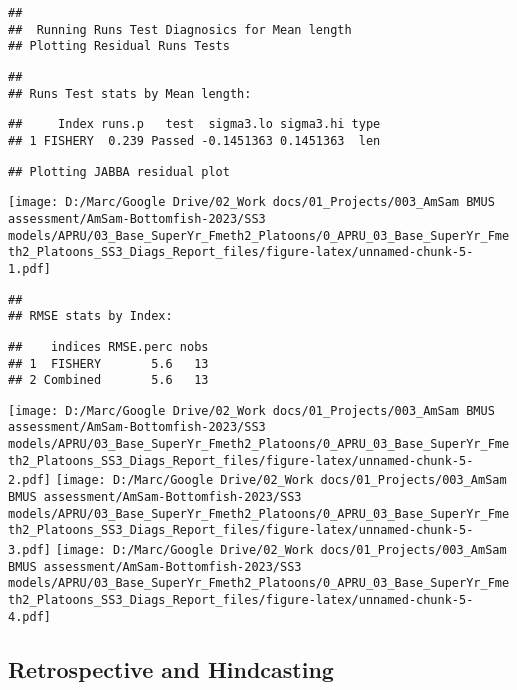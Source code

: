 \documentclass[
]{article}
\begin{document}
\begin{verbatim}
## 
##  Running Runs Test Diagnosics for Mean length 
## Plotting Residual Runs Tests
\end{verbatim}

\begin{verbatim}
## 
## Runs Test stats by Mean length:
\end{verbatim}

\begin{verbatim}
##     Index runs.p   test  sigma3.lo sigma3.hi type
## 1 FISHERY  0.239 Passed -0.1451363 0.1451363  len
\end{verbatim}

\begin{verbatim}
## Plotting JABBA residual plot
\end{verbatim}

\texttt{[image: D:/Marc/Google Drive/02\_Work docs/01\_Projects/003\_AmSam BMUS assessment/AmSam-Bottomfish-2023/SS3 models/APRU/03\_Base\_SuperYr\_Fmeth2\_Platoons/0\_APRU\_03\_Base\_SuperYr\_Fmeth2\_Platoons\_SS3\_Diags\_Report\_files/figure-latex/unnamed-chunk-5-1.pdf]}

\begin{verbatim}
## 
## RMSE stats by Index:
\end{verbatim}

\begin{verbatim}
##    indices RMSE.perc nobs
## 1  FISHERY       5.6   13
## 2 Combined       5.6   13
\end{verbatim}

\texttt{[image: D:/Marc/Google Drive/02\_Work docs/01\_Projects/003\_AmSam BMUS assessment/AmSam-Bottomfish-2023/SS3 models/APRU/03\_Base\_SuperYr\_Fmeth2\_Platoons/0\_APRU\_03\_Base\_SuperYr\_Fmeth2\_Platoons\_SS3\_Diags\_Report\_files/figure-latex/unnamed-chunk-5-2.pdf]}
\texttt{[image: D:/Marc/Google Drive/02\_Work docs/01\_Projects/003\_AmSam BMUS assessment/AmSam-Bottomfish-2023/SS3 models/APRU/03\_Base\_SuperYr\_Fmeth2\_Platoons/0\_APRU\_03\_Base\_SuperYr\_Fmeth2\_Platoons\_SS3\_Diags\_Report\_files/figure-latex/unnamed-chunk-5-3.pdf]}
\texttt{[image: D:/Marc/Google Drive/02\_Work docs/01\_Projects/003\_AmSam BMUS assessment/AmSam-Bottomfish-2023/SS3 models/APRU/03\_Base\_SuperYr\_Fmeth2\_Platoons/0\_APRU\_03\_Base\_SuperYr\_Fmeth2\_Platoons\_SS3\_Diags\_Report\_files/figure-latex/unnamed-chunk-5-4.pdf]}

\hypertarget{retrospective-and-hindcasting}{%
\subsection{Retrospective and
Hindcasting}\label{retrospective-and-hindcasting}}
\end{document}

